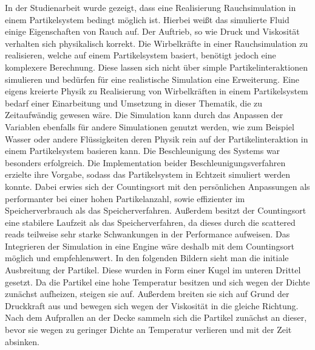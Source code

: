\documentclass[intern,palatino]{cgBA}
\begin{document}
In der Studienarbeit wurde gezeigt, dass eine Realisierung Rauchsimulation in einem Partikelsystem bedingt möglich ist.
Hierbei weißt das simulierte Fluid einige Eigenschaften von Rauch auf. Der Auftrieb, so wie Druck und Viskosität verhalten sich physikalisch korrekt. Die Wirbelkräfte in einer Rauchsimulation zu realisieren, welche auf einem Partikelsystem basiert, benötigt jedoch eine komplexere Berechnung. Diese lassen sich nicht über simple Partikelinteraktionen simulieren und bedürfen für eine realistische Simulation eine Erweiterung. Eine eigens kreierte Physik zu Realisierung von Wirbelkräften in einem Partikelsystem bedarf einer Einarbeitung und Umsetzung in dieser Thematik, die zu Zeitaufwändig gewesen wäre.
\newline
Die Simulation kann durch das Anpassen der Variablen ebenfalls für andere Simulationen genutzt werden, wie zum Beispiel Wasser oder andere Flüssigkeiten deren Physik rein auf der Partikelinteraktion in einem Partikelsystem basieren kann.
\newline
Die Beschleunigung des Systems war besonders erfolgreich. Die Implementation beider Beschleunigungsverfahren erzielte ihre Vorgabe, sodass das Partikelsystem in Echtzeit simuliert werden konnte. Dabei erwies sich der Countingsort mit den persönlichen Anpassungen als performanter bei einer hohen Partikelanzahl, sowie effizienter im Speicherverbrauch als das Speicherverfahren. Außerdem besitzt der Countingsort eine stabilere Laufzeit als das Speicherverfahren, da dieses durch die scattered reads teilweise sehr starke Schwankungen in der Performance aufweisen. 
\newline
Das Integrieren der Simulation in eine Engine  wäre deshalb mit dem Countingsort möglich und empfehlenswert.
\newline
In den folgenden Bildern sieht man die initiale Ausbreitung der Partikel. Diese wurden in Form einer Kugel im unteren Drittel gesetzt. Da die Partikel eine hohe Temperatur besitzen und sich wegen der Dichte zunächst aufheizen, steigen sie auf. Außerdem breiten sie sich auf Grund der Druckkraft aus und bewegen sich wegen der Viskosität in die gleiche Richtung. Nach dem Aufprallen an der Decke sammeln sich die Partikel zunächst an dieser, bevor sie wegen zu geringer Dichte an Temperatur verlieren und mit der Zeit absinken.
\end{document}
